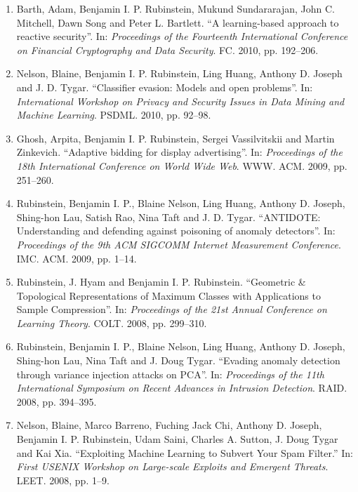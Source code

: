 \documentclass[a4paper,12pt]{article}
\begin{document}
\begin{enumerate}
\item Barth, Adam, Benjamin I. P. Rubinstein, Mukund Sundararajan, John C. Mitchell, Dawn Song and Peter L. Bartlett.
``A learning-based approach to reactive security''.
In: 
\emph{Proceedings of the Fourteenth International Conference on Financial Cryptography and Data Security}.
FC.
2010, pp. 192--206.

\item Nelson, Blaine, Benjamin I. P. Rubinstein, Ling Huang, Anthony D. Joseph and J. D. Tygar.
``Classifier evasion: Models and open problems''.
In: 
\emph{International Workshop on Privacy and Security Issues in Data Mining and Machine Learning}.
PSDML.
2010, pp. 92--98.

\item Ghosh, Arpita, Benjamin I. P. Rubinstein, Sergei Vassilvitskii and Martin Zinkevich.
``Adaptive bidding for display advertising''.
In: 
\emph{Proceedings of the 18th International Conference on World Wide Web}.
WWW.
ACM.
2009, pp. 251--260.

\item Rubinstein, Benjamin I. P., Blaine Nelson, Ling Huang, Anthony D. Joseph, Shing-hon Lau, Satish Rao, Nina Taft and J. D. Tygar.
``ANTIDOTE: Understanding and defending against poisoning of anomaly detectors''.
In: 
\emph{Proceedings of the 9th ACM SIGCOMM Internet Measurement Conference}.
IMC.
ACM.
2009, pp. 1--14.

\item Rubinstein, J. Hyam and Benjamin I. P. Rubinstein.
``Geometric \& Topological Representations of Maximum Classes with Applications to Sample Compression''.
In: 
\emph{Proceedings of the 21st Annual Conference on Learning Theory}.
COLT.
2008, pp. 299--310.

\item Rubinstein, Benjamin I. P., Blaine Nelson, Ling Huang, Anthony D. Joseph, Shing-hon Lau, Nina Taft and J. Doug Tygar.
``Evading anomaly detection through variance injection attacks on PCA''.
In: 
\emph{Proceedings of the 11th International Symposium on Recent Advances in Intrusion Detection}.
RAID.
2008, pp. 394--395.

\item Nelson, Blaine, Marco Barreno, Fuching Jack Chi, Anthony D. Joseph, Benjamin I. P. Rubinstein, Udam Saini, Charles A. Sutton, J. Doug Tygar and Kai Xia.
``Exploiting Machine Learning to Subvert Your Spam Filter.''
In: 
\emph{First USENIX Workshop on Large-scale Exploits and Emergent Threats}.
LEET.
2008, pp. 1--9.


\end{enumerate}
\end{document}
